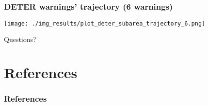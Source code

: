 \documentclass{beamer}
\begin{document}
\begin{frame}
    \frametitle{DETER warnings' trajectory (6 warnings) }
    \texttt{[image: ./img\_results/plot\_deter\_subarea\_trajectory\_6.png]}
\end{frame}





\begin{frame}
    Questions?
\end{frame}




\section{References}

\begin{frame}[t, allowframebreaks]
    \frametitle{References}
    
    
\end{frame}
\end{document}
